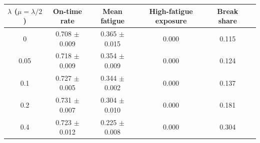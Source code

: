 \begin{tabular}{cccccc}
\toprule
$\lambda$ ($\mu=\lambda/2$) & On-time rate & Mean fatigue & High-fatigue exposure & Break share \\
\midrule
0 & 0.708 $\pm$ 0.009 & 0.365 $\pm$ 0.015 & 0.000 & 0.115 \\
0.05 & 0.718 $\pm$ 0.009 & 0.354 $\pm$ 0.009 & 0.000 & 0.124 \\
0.1 & 0.727 $\pm$ 0.005 & 0.344 $\pm$ 0.002 & 0.000 & 0.137 \\
0.2 & 0.731 $\pm$ 0.007 & 0.304 $\pm$ 0.010 & 0.000 & 0.181 \\
0.4 & 0.723 $\pm$ 0.012 & 0.225 $\pm$ 0.008 & 0.000 & 0.304 \\
\bottomrule
\end{tabular}
